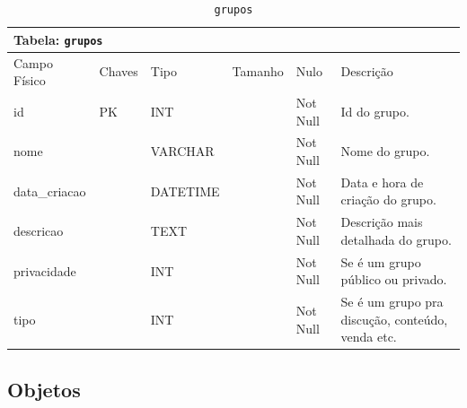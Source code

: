 \documentclass[12pt,a4paper]{article}
\begin{document}
\begin{center}
\begin{table}[h!]
	\caption{\texttt{grupos}}
	\label{tabela:grupos}
	\begin{tabular}{|p{2.3cm}|p{1.2cm}|p{1.8cm}|p{1.5cm}|p{1cm}|p{6cm}|}\hline	
		\multicolumn{6}{|p{16cm}|}{\cellcolor{cinzaClaro}  \centering Tabela: \texttt{grupos}} \\ \hline %
		{\small Campo Físico}   & {\small Chaves} & {\small Tipo} & {\small Tamanho} & {\small Nulo} & {\small Descrição}\\\hline %
		
		{\tiny id} & {\tiny PK} & {\tiny INT} & {\tiny } & {\tiny Not Null} &{\tiny Id do grupo.}\\\hline
		{\tiny nome} & {\tiny } & {\tiny VARCHAR} & {\tiny } & {\tiny Not Null} &{\tiny Nome do grupo.}\\\hline
		{\tiny data\_criacao} & {\tiny } & {\tiny DATETIME} & {\tiny } & {\tiny Not Null} &{\tiny Data e hora de criação do grupo.}\\\hline
		{\tiny descricao} & {\tiny } & {\tiny TEXT} & {\tiny } & {\tiny Not Null} &{\tiny Descrição mais detalhada do grupo.}\\\hline
		{\tiny privacidade} & {\tiny } & {\tiny INT} & {\tiny } & {\tiny Not Null} &{\tiny Se é um grupo público ou privado.
}\\\hline
		{\tiny tipo} & {\tiny } & {\tiny INT} & {\tiny } & {\tiny Not Null} &{\tiny Se é um grupo pra discução, conteúdo, venda etc.}\\\hline
			
	\end{tabular}
\end{table}	
\end{center}



\subsection{Objetos}

\end{document}

